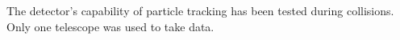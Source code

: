 

The detector's capability of particle tracking has been tested during collisions. Only one telescope was used to take data. 

